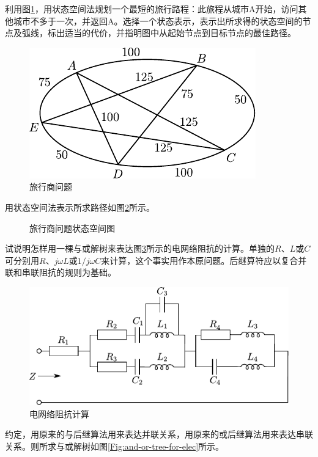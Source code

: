 \begin{question}
利用图\ref{Fig:TSP-problem}，用状态空间法规划一个最短的旅行路程：此旅程从城市A开始，访问其他城市不多于一次，并返回A。选择一个状态表示，表示出所求得的状态空间的节点及弧线，标出适当的代价，并指明图中从起始节点到目标节点的最佳路径。
\begin{figure} [h]
		\centering
		\includegraphics[scale=.8]{figures/ques-2.3.pdf}
		\caption{旅行商问题} \label{Fig:TSP-problem}
	\end{figure}
\end{question}
\begin{solution}
用状态空间法表示所求路径如图\ref{Fig:TSP-answer}所示。
	\begin{figure} [h]
		\centering
		
		\caption{旅行商问题状态空间图} \label{Fig:TSP-answer}
	\end{figure}
\end{solution}

\begin{question}
试说明怎样用一棵与或解树来表达图\ref{Fig:elec}所示的电网络阻抗的计算。单独的$R$、$L$或$C$可分别用$R$、$j\omega L$或$1/j\omega C$来计算，这个事实用作本原问题。后继算符应以复合并联和串联阻抗的规则为基础。
	\begin{figure}[H]
		\centering
		\includegraphics{figures/ques-2.4.pdf}
		\caption{电网络阻抗计算} \label{Fig:elec}
	\end{figure}
\end{question}
\begin{solution}
约定，用原来的与后继算法用来表达并联关系，用原来的或后继算法用来表达串联关系。则所求与或解树如图\ref{Fig:and-or-tree-for-elec}所示。
\end{solution}

